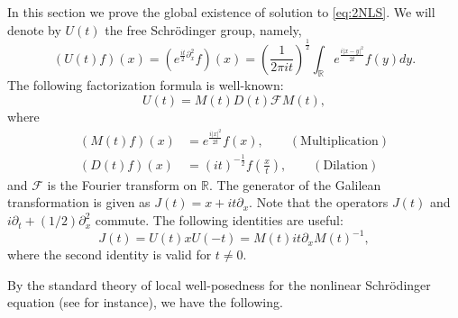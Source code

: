 \documentclass[11pt,a4paper,twosides]{amsart}
\theoremstyle{plain}
\theoremstyle{remark}
\numberwithin{equation}{section}
\newcommand{\R}{\mathbb{R}}
\theoremstyle{definition}
\newcommand{\1}{{\bf 1}_{\{|x| < |t|\}}}
\begin{document}
In this section we prove the global existence of 
solution to \eqref{eq:2NLS}. 
We will denote by $U(t)$ the free Schr\"odinger group, 
namely,
\begin{equation}
  (U(t)f)(x) = (e^{\frac{it}{2}\partial_x^2}f)(x)
  =\left(\frac{1}{2\pi it}\right)^{\frac12}
  \int_{\R}e^{\frac{i|x-y|^2}{2t}}f(y)dy.
\end{equation}
The following factorization formula is well-known:
\begin{equation}
  U(t) = M(t)D(t)\mathcal{F}M(t),
\end{equation}
where 
\begin{align*}
(M(t)f)(x) &= e^{\frac{i|x|^2}{2t}}f(x),\qquad(\text{Multiplication})\\
(D(t)f)(x) &= (it)^{-\frac12}f\left(\frac{x}{t}\right),
\qquad(\text{Dilation})
\end{align*}
and $\mathcal{F}$ is the Fourier transform on $\R$.
The generator of  the Galilean transformation is given as 
$J(t)=x+it\partial_x$. 
Note that the operators $J(t)$ and 
$i\partial_t +(1/2)\partial^2_x$ commute. 
The following identities are useful:
\[
	J(t) = U(t) x U(-t) = M(t) it \partial_x M(t)^{-1},
\]
where the second identity is valid for $t\neq0$.


By the standard theory of local well-posedness for 
the nonlinear Schr\"{o}dinger equation 
(see \cite{Caz} for instance), 
we have the following.
\end{document}
